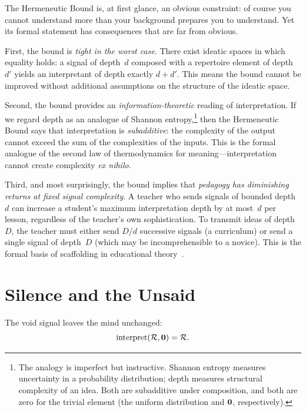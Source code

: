 The Hermeneutic Bound is, at first glance, an obvious constraint: of
course you cannot understand more than your background prepares you to
understand.  Yet its formal statement has consequences that are far from
obvious.

First, the bound is \emph{tight in the worst case}.  There exist ideatic
spaces in which equality holds: a signal of depth~$d$ composed with a
repertoire element of depth~$d'$ yields an interpretant of depth exactly
$d + d'$.  This means the bound cannot be improved without additional
assumptions on the structure of the ideatic space.

Second, the bound provides an \emph{information-theoretic} reading of
interpretation.  If we regard depth as an analogue of
Shannon entropy,\footnote{The analogy is imperfect but instructive.
Shannon entropy measures uncertainty in a probability distribution;
depth measures structural complexity of an idea.  Both are subadditive
under composition, and both are zero for the trivial element (the
uniform distribution and $\mathbf{0}$, respectively).} then the
Hermeneutic Bound says that interpretation is \emph{subadditive}: the
complexity of the output cannot exceed the sum of the complexities of
the inputs.  This is the formal analogue of the second law of
thermodynamics for meaning---interpretation cannot create complexity
\emph{ex nihilo}.

Third, and most surprisingly, the bound implies that \emph{pedagogy
has diminishing returns at fixed signal complexity}.  A teacher who
sends signals of bounded depth~$d$ can increase a student's maximum
interpretation depth by at most~$d$ per lesson, regardless of the
teacher's own sophistication.  To transmit ideas of depth~$D$, the
teacher must either send $D/d$ successive signals (a curriculum) or
send a single signal of depth~$D$ (which may be incomprehensible to a
novice).  This is the formal basis of scaffolding in educational
theory~\cite{vygotsky1978}.

\section{Silence and the Unsaid}
\label{sec:ch1:silence}

\begin{theorem}
\label{thm:silence-transparent}
The void signal leaves the mind unchanged:
\[
  \operatorname{interpret}(\mathcal{R}, \mathbf{0}) = \mathcal{R}.
\]
\end{theorem}


